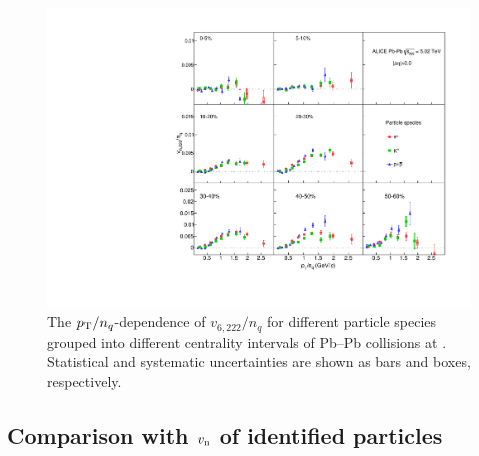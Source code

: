 \begin{figure}[!htb]
\begin{center}
\includegraphics[scale=0.82]{figures/scaling/All_v6222_gap00_NCQ_3by3.pdf}
\end{center}
\caption{The $p_{\rm{T}}/n_{q}$-dependence of $v_{6,222}/n_{q}$ for different particle species grouped into different centrality intervals of Pb--Pb collisions at \sNN. Statistical and systematic uncertainties are shown as bars and boxes, respectively.}
\label{v6222_NCQ}
\end{figure}


\subsection{Comparison with $v_{\rm n}$ of identified particles}
\label{SubSec:comparewithvn}

